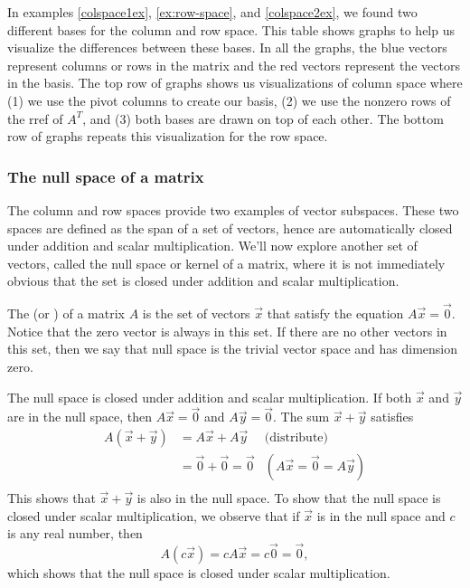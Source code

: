 \begin{table}
\caption{\label{column and row space table} In examples \ref{colspace1ex}, \ref{ex:row-space}, and \ref{colspace2ex}, we found two different bases for the column and row space. This table shows graphs to help us visualize the differences between these bases.  In all the graphs, the blue vectors represent columns or rows in the matrix and the red vectors represent the vectors in the basis.  
The top row of graphs shows us visualizations of column space where (1) we use the pivot columns to create our basis, (2) we use the nonzero rows of the rref of $A^T$, and (3) both bases are drawn on top of each other.
The bottom row of graphs repeats this visualization for the row space.}
\end{table}

\subsubsection{The null space of a matrix}
The column and row spaces provide two examples of vector
subspaces. These two spaces are defined as the span of a set of
vectors, hence are automatically closed under addition and scalar
multiplication. We'll now explore another set of vectors, called the
null space or kernel of a matrix, where it is not immediately obvious that the set is closed under addition and scalar multiplication.

The  (or )
%
of a matrix $A$ is the set of vectors $\vec x$ that satisfy the equation $A\vec x=\vec 0$. Notice that the zero vector is always in this set. If there are no other vectors in this set, then we say that null space is the trivial vector space and has dimension zero.  

The null space is closed under addition and scalar multiplication.  If both $\vec x$ and $\vec y$ are in the null space, then $A\vec x=\vec 0$ and $A\vec y=\vec 0$. The sum $\vec x+\vec y$ satisfies 
\begin{align*}
A(\vec x+\vec y)
&= A\vec x+A\vec y &\text{(distribute)}\\
&= \vec 0 +\vec 0 = \vec 0 &(A\vec x = \vec 0 =A\vec y)\\
\end{align*}
This shows that $\vec x+\vec y$ is also in the null space.  
To show that the null space is closed under scalar multiplication, we observe that if $\vec x$ is in the null space and $c$ is any real number, then $$A(c\vec x) = cA\vec x = c\vec 0 = \vec 0,$$
which shows that the null space is closed under scalar multiplication.

